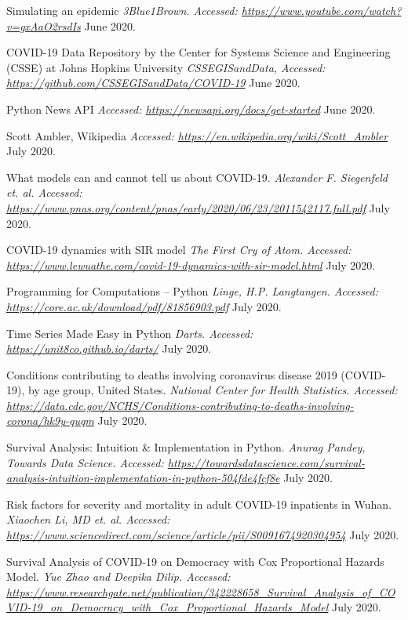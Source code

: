\begin{thebibliography}{1}
 Simulating an epidemic {\em 3Blue1Brown. Accessed:  \url{https://www.youtube.com/watch?v=gxAaO2rsdIs}} June 2020.

 COVID-19 Data Repository by the Center for Systems Science and Engineering (CSSE) at Johns Hopkins University {\em CSSEGISandData, Accessed:  \url{https://github.com/CSSEGISandData/COVID-19}} June 2020.

 Python News API {\em Accessed:  \url{https://newsapi.org/docs/get-started}} June 2020.

 Scott Ambler, Wikipedia {\em Accessed:  \url{https://en.wikipedia.org/wiki/Scott_Ambler}} July 2020.

 What models can and cannot tell us about COVID-19. {\em Alexander F. Siegenfeld et. al. Accessed:  \url{https://www.pnas.org/content/pnas/early/2020/06/23/2011542117.full.pdf}} July 2020.

 COVID-19 dynamics with SIR model {\em The First Cry of Atom. Accessed:  \url{https://www.lewuathe.com/covid-19-dynamics-with-sir-model.html}} July 2020.

 Programming for Computations – Python {\em Linge, H.P. Langtangen. Accessed:  \url{https://core.ac.uk/download/pdf/81856903.pdf}} July 2020.

 Time Series Made Easy in Python {\em Darts. Accessed:  \url{https://unit8co.github.io/darts/}} July 2020.

 Conditions contributing to deaths involving coronavirus disease 2019 (COVID-19), by age group, United States. {\em 	National Center for Health Statistics. Accessed:  \url{https://data.cdc.gov/NCHS/Conditions-contributing-to-deaths-involving-corona/hk9y-quqm}} July 2020.

 Survival Analysis: Intuition & Implementation in Python. {\em 	Anurag Pandey, Towards Data Science. Accessed:  \url{https://towardsdatascience.com/survival-analysis-intuition-implementation-in-python-504fde4fcf8e}} July 2020.

 Risk factors for severity and mortality in adult COVID-19 inpatients in Wuhan. {\em Xiaochen Li, MD et. al. Accessed:  \url{https://www.sciencedirect.com/science/article/pii/S0091674920304954}} July 2020.

 Survival Analysis of COVID-19 on Democracy with Cox Proportional Hazards Model. {\em 	Yue Zhao and Deepika Dilip. Accessed:  \url{https://www.researchgate.net/publication/342228658_Survival_Analysis_of_COVID-19_on_Democracy_with_Cox_Proportional_Hazards_Model}} July 2020.


\end{thebibliography}
